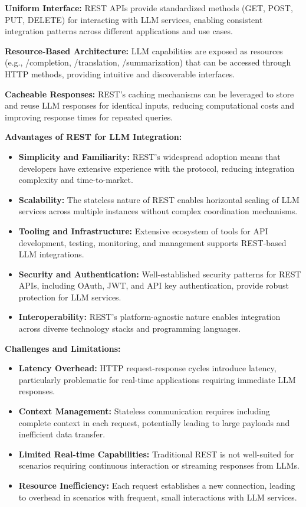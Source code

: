 \textbf{Uniform Interface:} REST APIs provide standardized methods (GET, POST, PUT, DELETE) for interacting with LLM services, enabling consistent integration patterns across different applications and use cases.

\textbf{Resource-Based Architecture:} LLM capabilities are exposed as resources (e.g., /completion, /translation, /summarization) that can be accessed through HTTP methods, providing intuitive and discoverable interfaces.

\textbf{Cacheable Responses:} REST's caching mechanisms can be leveraged to store and reuse LLM responses for identical inputs, reducing computational costs and improving response times for repeated queries.

\textbf{Advantages of REST for LLM Integration:}

\begin{itemize}
    \item \textbf{Simplicity and Familiarity:} REST's widespread adoption means that developers have extensive experience with the protocol, reducing integration complexity and time-to-market.
    \item \textbf{Scalability:} The stateless nature of REST enables horizontal scaling of LLM services across multiple instances without complex coordination mechanisms.
    \item \textbf{Tooling and Infrastructure:} Extensive ecosystem of tools for API development, testing, monitoring, and management supports REST-based LLM integrations.
    \item \textbf{Security and Authentication:} Well-established security patterns for REST APIs, including OAuth, JWT, and API key authentication, provide robust protection for LLM services.
    \item \textbf{Interoperability:} REST's platform-agnostic nature enables integration across diverse technology stacks and programming languages.
\end{itemize}

\textbf{Challenges and Limitations:}

\begin{itemize}
    \item \textbf{Latency Overhead:} HTTP request-response cycles introduce latency, particularly problematic for real-time applications requiring immediate LLM responses.
    \item \textbf{Context Management:} Stateless communication requires including complete context in each request, potentially leading to large payloads and inefficient data transfer.
    \item \textbf{Limited Real-time Capabilities:} Traditional REST is not well-suited for scenarios requiring continuous interaction or streaming responses from LLMs.
    \item \textbf{Resource Inefficiency:} Each request establishes a new connection, leading to overhead in scenarios with frequent, small interactions with LLM services.
\end{itemize}

